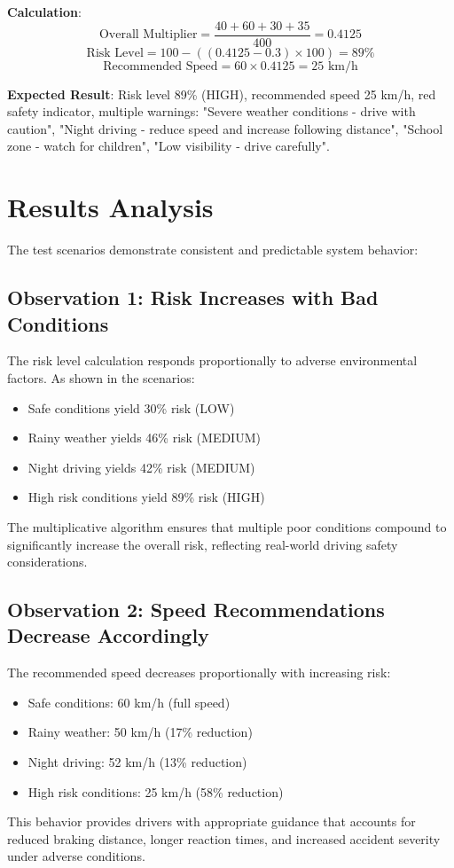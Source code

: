 \textbf{Calculation}:
\begin{equation}
\text{Overall Multiplier} = \frac{40 + 60 + 30 + 35}{400} = 0.4125
\end{equation}
\begin{equation}
\text{Risk Level} = 100 - ((0.4125 - 0.3) \times 100) = 89\%
\end{equation}
\begin{equation}
\text{Recommended Speed} = 60 \times 0.4125 = 25 \text{ km/h}
\end{equation}

\textbf{Expected Result}: Risk level 89\% (HIGH), recommended speed 25 km/h, red safety indicator, multiple warnings: "Severe weather conditions - drive with caution", "Night driving - reduce speed and increase following distance", "School zone - watch for children", "Low visibility - drive carefully".

\section{Results Analysis}
The test scenarios demonstrate consistent and predictable system behavior:

\subsection{Observation 1: Risk Increases with Bad Conditions}
The risk level calculation responds proportionally to adverse environmental factors. As shown in the scenarios:
\begin{itemize}
    \item Safe conditions yield 30\% risk (LOW)
    \item Rainy weather yields 46\% risk (MEDIUM)
    \item Night driving yields 42\% risk (MEDIUM)
    \item High risk conditions yield 89\% risk (HIGH)
\end{itemize}
The multiplicative algorithm ensures that multiple poor conditions compound to significantly increase the overall risk, reflecting real-world driving safety considerations.

\subsection{Observation 2: Speed Recommendations Decrease Accordingly}
The recommended speed decreases proportionally with increasing risk:
\begin{itemize}
    \item Safe conditions: 60 km/h (full speed)
    \item Rainy weather: 50 km/h (17\% reduction)
    \item Night driving: 52 km/h (13\% reduction)
    \item High risk conditions: 25 km/h (58\% reduction)
\end{itemize}
This behavior provides drivers with appropriate guidance that accounts for reduced braking distance, longer reaction times, and increased accident severity under adverse conditions.

